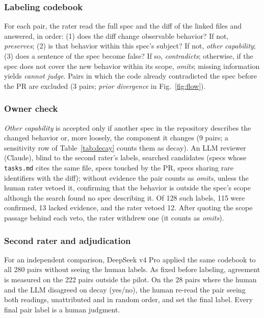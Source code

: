 \documentclass[10pt,conference]{IEEEtran}
\begin{document}
\subsubsection{Labeling codebook}
For each pair, the rater read the full spec and the diff of the linked files and answered, in order: (1) does the diff change observable behavior? If not, \emph{preserves}; (2) is that behavior within this spec's subject? If not, \emph{other capability}; (3) does a sentence of the spec become false? If so, \emph{contradicts}; otherwise, if the spec does not cover the new behavior within its scope, \emph{omits}; missing information yields \emph{cannot judge}. Pairs in which the code already contradicted the spec before the PR are excluded (3 pairs; \emph{prior divergence} in Fig.~\ref{fig:flow}).

\subsubsection{Owner check}
\emph{Other capability} is accepted only if another spec in the repository describes the changed behavior or, more loosely, the component it changes (9 pairs; a sensitivity row of Table~\ref{tab:decay} counts them as decay). An LLM reviewer (Claude), blind to the second rater's labels, searched candidates (specs whose \texttt{tasks.md} cites the same file, specs touched by the PR, specs sharing rare identifiers with the diff); without evidence the pair counts as \emph{omits}, unless the human rater vetoed it, confirming that the behavior is outside the spec's scope although the search found no spec describing it. Of 128 such labels, 115 were confirmed, 13 lacked evidence, and the rater vetoed 12. After quoting the scope passage behind each veto, the rater withdrew one (it counts as \emph{omits}).

\subsubsection{Second rater and adjudication}
For an independent comparison, DeepSeek v4 Pro applied the same codebook to all 280 pairs without seeing the human labels. As fixed before labeling, agreement is measured on the 222 pairs outside the pilot. On the 28 pairs where the human and the LLM disagreed on decay (yes/no), the human re-read the pair seeing both readings, unattributed and in random order, and set the final label. Every final pair label is a human judgment.
\end{document}
